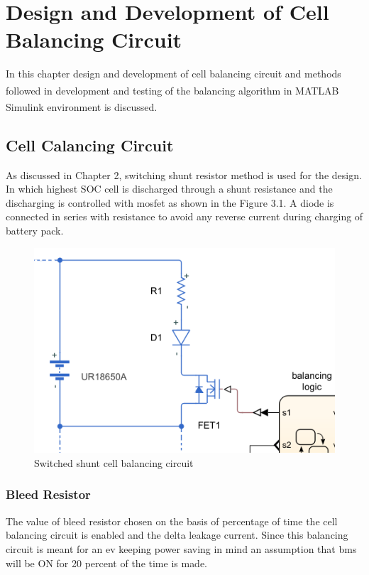 \chapter{Design and Development of Cell Balancing Circuit}

\indent\indent In this chapter design and development of cell balancing circuit and methods followed in development and testing of  the balancing algorithm in MATLAB\textsuperscript{\textregistered} Simulink\textsuperscript{\textregistered} environment is discussed. 


\section{Cell Calancing Circuit}
As discussed in Chapter 2, switching shunt resistor method is used for the design. In which highest SOC cell is discharged through a shunt resistance and the discharging is controlled with \acrshort{mosfet} as shown in the Figure 3.1. A diode is connected in series with resistance to avoid any reverse current during charging of battery pack.

\begin{figure}[h!]
    \centering
    \includegraphics[]{Chapter3/Figures/cell_bal_ckt.PNG}
    \caption{Switched shunt cell balancing circuit}
\end{figure}

\subsection{Bleed Resistor}
The value of bleed resistor chosen on the basis of percentage of time the cell balancing circuit is enabled and the delta leakage current. Since this balancing circuit is meant for an \acrshort{ev} keeping power saving in mind an assumption that \acrshort{bms} will be ON for 20 percent of the time is made.

